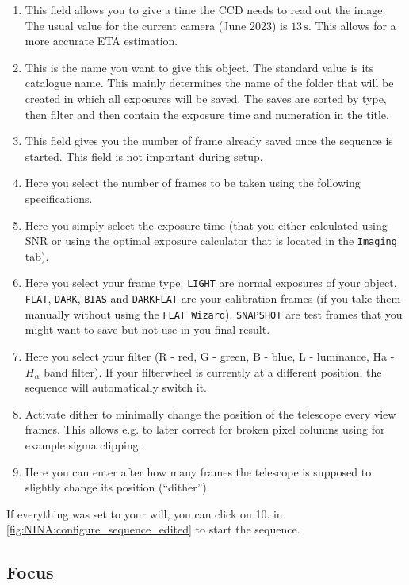 \documentclass[a4paper, 11pt, fleqn]{memoir}
\begin{document}
\begin{enumerate}
    \item This field allows you to give a time the CCD needs to read out the image. The usual value for the current camera (June 2023) is $13\,\si{\second}$. This allows for a more accurate ETA estimation.
    \item This is the name you want to give this object. The standard value is its catalogue name. This mainly determines the name of the folder that will be created in which all exposures will be saved. The saves are sorted by type, then filter and then contain the exposure time and numeration in the title.
    \item This field gives you the number of frame already saved once the sequence is started. This field is not important during setup.
    \item Here you select the number of frames to be taken using the following specifications.
    \item Here you simply select the exposure time (that you either calculated using SNR or using the optimal exposure calculator that is located in the \texttt{Imaging} tab).
    \item Here you select your frame type. \texttt{LIGHT} are normal exposures of your object. \texttt{FLAT}, \texttt{DARK}, \texttt{BIAS} and \texttt{DARKFLAT} are your calibration frames (if you take them manually without using the \texttt{FLAT Wizard}). \texttt{SNAPSHOT} are test frames that you might want to save but not use in you final result.
    \item Here you select your filter (R - red, G - green, B - blue, L - luminance, Ha - $H_\alpha$ band filter). If your filterwheel is currently at a different position, the sequence will automatically switch it.
    \item Activate dither to minimally change the position of the telescope every view frames. This allows e.g. to later correct for broken pixel columns using for example sigma clipping.
    \item Here you can enter after how many frames the telescope is supposed to slightly change its position (``dither''). 
\end{enumerate}
If everything was set to your will, you can click on 10. in \ref{fig:NINA:configure_sequence_edited} to start the sequence.



\subsection{Focus}
\end{document}
